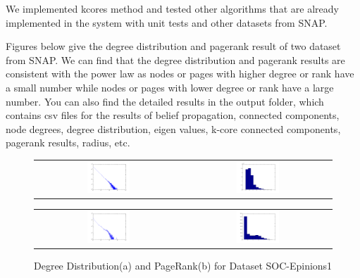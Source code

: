 
We implemented kcores method
and tested other algorithms that are already implemented in the system with unit tests and other datasets from SNAP.

Figures below give the degree distribution and pagerank result of two dataset from SNAP. We can find that the degree distribution and pagerank results are consistent with the power law as nodes or pages with higher degree or rank have a small number while nodes or pages with lower degree or rank have a large number.
You can also find the detailed results in the output folder, which contains csv files for the results of belief propagation, connected components, node degrees, degree distribution, eigen values, k-core connected components, pagerank results, radius, etc. 


\begin{figure}[H]
\begin{center}
\begin{tabular}{cc}
     \includegraphics[width=0.3\textwidth]{FIG/soc-degreedist.png} &
     \includegraphics[width=0.3\textwidth]{FIG/soc-pagerank.png} \\
\end{tabular}
\caption{Degree Distribution(a) and PageRank(b) for Dataset SOC-Epinions1}

\begin{tabular}{cc}
\includegraphics[width=0.3\textwidth]{FIG/wiki-degreedist.png} &
     \includegraphics[width=0.3\textwidth]{FIG/wiki-pagerank.png} \\


\end{tabular}
\end{center}
\end{figure}
